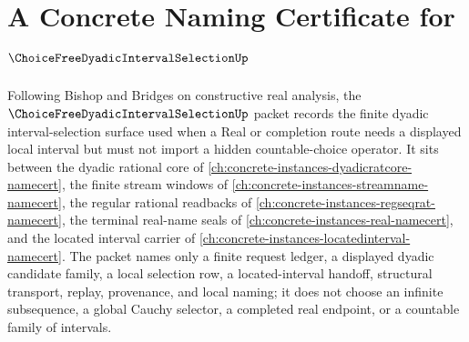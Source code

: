 \chapter{A Concrete Naming Certificate for $\ChoiceFreeDyadicIntervalSelectionUp$}
\label{ch:concrete-instances-choice-free-dyadic-interval-selection-namecert}

Following Bishop and Bridges on constructive real analysis, the $\ChoiceFreeDyadicIntervalSelectionUp$ packet records the finite dyadic interval-selection surface used when a Real or completion route needs a displayed local interval but must not import a hidden countable-choice operator. It sits between the dyadic rational core of \autoref{ch:concrete-instances-dyadicratcore-namecert}, the finite stream windows of \autoref{ch:concrete-instances-streamname-namecert}, the regular rational readbacks of \autoref{ch:concrete-instances-regseqrat-namecert}, the terminal real-name seals of \autoref{ch:concrete-instances-real-namecert}, and the located interval carrier of \autoref{ch:concrete-instances-locatedinterval-namecert}. The packet names only a finite request ledger, a displayed dyadic candidate family, a local selection row, a located-interval handoff, structural transport, replay, provenance, and local naming; it does not choose an infinite subsequence, a global Cauchy selector, a completed real endpoint, or a countable family of intervals.


